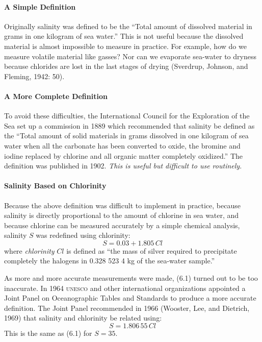 \paragraph{A Simple Definition}
Originally salinity was defined to be the
``Total amount of dissolved material in grams
in one kilogram of sea water.'' This is not useful because the
dissolved material is almost impossible to measure in practice. For
example, how do we measure volatile material like gasses? Nor can we
evaporate sea-water to dryness because chlorides are lost in the last
stages of drying (Sverdrup, Johnson, and Fleming, 1942: 50).

\paragraph{A More Complete Definition}
To avoid these difficulties, the International Council for the Exploration of the Sea
set up a commission in 1889 which recommended that salinity be defined
as the ``Total amount of solid materials in grams dissolved in one
kilogram of sea water when all the carbonate has been converted to
oxide, the bromine and iodine replaced by chlorine and all organic
matter completely oxidized.'' The definition was published in
1902. \textit{This is useful but difficult to use routinely}.

\paragraph{Salinity Based on Chlorinity}
Because the above definition was difficult to implement in practice, because salinity is directly
proportional to the amount of chlorine in sea water, and because
chlorine can be measured accurately by a simple chemical analysis,
salinity $S$ was redefined using chlorinity:
\begin{equation}
S = 0.03 + 1.805\, Cl
\end{equation}
where \textit{chlorinity} $Cl$ is defined as
``the mass of silver required to precipitate completely the halogens
in 0.328 523 4 kg of the sea-water sample.''

As more and more accurate measurements were made, (6.1) turned out to
be too inaccurate. In 1964 \textsc{unesco} and other international
organizations appointed a Joint Panel on Oceanographic Tables and
Standards to produce a more accurate definition. The Joint Panel
recommended in 1966 (Wooster, Lee, and Dietrich, 1969) that salinity
and chlorinity be related using:
\begin{equation}
S = 1.806\,55\,Cl
\end{equation}
This is the same as (6.1) for $S=35$.

